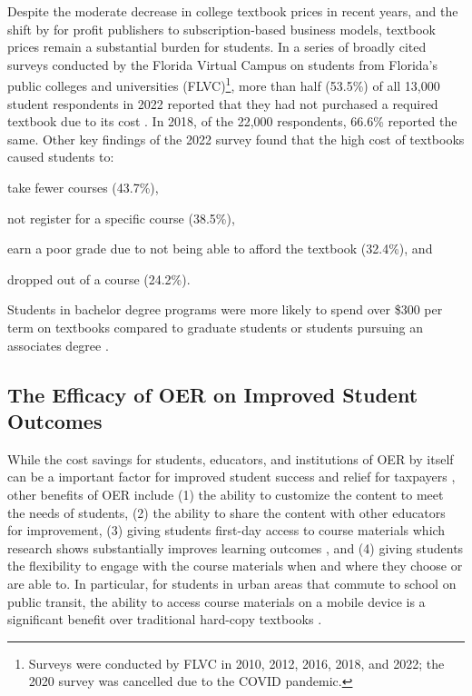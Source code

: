 \documentclass[11pt]{article}
\begin{document}
Despite the moderate decrease in college textbook prices in recent years, and the shift by for profit publishers to subscription-based business models, textbook prices remain a substantial burden for students.  In a series of broadly cited surveys conducted by the Florida Virtual Campus on students from Florida's public colleges and universities (FLVC)\footnote{Surveys were conducted by FLVC in 2010, 2012, 2016, 2018, and 2022; the 2020 survey was cancelled due to the COVID pandemic.}, more than half (53.5\%) of all 13,000 student respondents in 2022 reported that they had not purchased a required textbook due to its cost \cite{flvc2022}. In 2018, of the 22,000 respondents, 66.6\% reported the same.  Other key findings of the 2022 survey found that the high cost of textbooks caused students to:
\begin{compactitem}
\item take fewer courses (43.7\%),
\item not register for a specific course (38.5\%),
\item earn a poor grade due to not being able to afford the textbook (32.4\%), and
\item dropped out of a course (24.2\%).
\end{compactitem}
Students in bachelor degree programs were more likely to spend over \$300 per term on textbooks compared to graduate students or students pursuing an associates degree \cite{flvc2022}.  

\subsection{The Efficacy of OER on Improved Student Outcomes}
While the cost savings for students, educators, and institutions of OER by itself can be a important factor for improved student success and relief for taxpayers \cite{TB-JR-JH:13, RF-RP-BD:15, CW-DD-SC:17}, other benefits of OER include (1) the ability to customize the content to meet the needs of students, (2) the ability to share the content with other educators for improvement, (3) giving students first-day access to course materials which research shows substantially improves learning outcomes \cite{LA:2017}, and (4) giving students the flexibility to engage with the course materials when and where they choose or are able to.  In particular, for students in urban areas that commute to school on public transit, the ability to access course materials on a mobile device is a significant benefit over traditional hard-copy textbooks \cite{CC:17, MS:14}.
\end{document}
